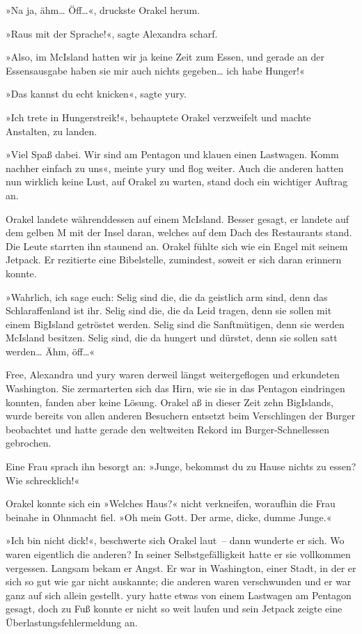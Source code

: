 »Na ja, ähm… Öff…«, druckste Orakel herum.

»Raus mit der Sprache!«, sagte Alexandra scharf.

»Also, im McIsland hatten wir ja keine Zeit zum Essen, und gerade an der Essensausgabe haben sie mir auch nichts gegeben… ich habe Hunger!«

»Das kannst du echt knicken«, sagte yury.

»Ich trete in Hungerstreik!«, behauptete Orakel verzweifelt und machte Anstalten, zu landen.

»Viel Spaß dabei. Wir sind am Pentagon und klauen einen Lastwagen. Komm nachher einfach zu uns«, meinte yury und flog weiter. Auch die anderen hatten nun wirklich keine Lust, auf Orakel zu warten, stand doch ein wichtiger Auftrag an.

Orakel landete währenddessen auf einem McIsland. Besser gesagt, er landete auf dem gelben M mit der Insel daran, welches auf dem Dach des Restaurants stand. Die Leute starrten ihn staunend an. Orakel fühlte sich wie ein Engel mit seinem Jetpack. Er rezitierte eine Bibelstelle, zumindest, soweit er sich daran erinnern konnte.

»Wahrlich, ich sage euch: Selig sind die, die da geistlich arm sind, denn das Schlaraffenland ist ihr. Selig sind die, die da Leid tragen, denn sie sollen mit einem BigIsland getröstet werden. Selig sind die Sanftmütigen, denn sie werden McIsland besitzen. Selig sind, die da hungert und dürstet, denn sie sollen satt werden… Ähm, öff…«

Free, Alexandra und yury waren derweil längst weitergeflogen und erkundeten Washington. Sie zermarterten sich das Hirn, wie sie in das Pentagon eindringen konnten, fanden aber keine Lösung.
Orakel aß in dieser Zeit zehn BigIslands, wurde bereits von allen anderen Besuchern entsetzt beim Verschlingen der Burger beobachtet und hatte gerade den weltweiten Rekord im Burger-Schnellessen gebrochen.

Eine Frau sprach ihn besorgt an: »Junge, bekommst du zu Hause nichts zu essen? Wie schrecklich!«

Orakel konnte sich ein »Welches Haus?« nicht verkneifen, woraufhin die Frau beinahe in Ohnmacht fiel. »Oh mein Gott. Der arme, dicke, dumme Junge.«

»Ich bin nicht dick!«, beschwerte sich Orakel laut~– dann wunderte er sich. Wo waren eigentlich die anderen? In seiner Selbstgefälligkeit hatte er sie vollkommen vergessen. Langsam bekam er Angst. Er war in Washington, einer Stadt, in der er sich so gut wie gar nicht auskannte; die anderen waren verschwunden und er war ganz auf sich allein gestellt. yury hatte etwas von einem Lastwagen am Pentagon gesagt, doch zu Fuß konnte er nicht so weit laufen und sein Jetpack zeigte eine Überlastungsfehlermeldung an.

